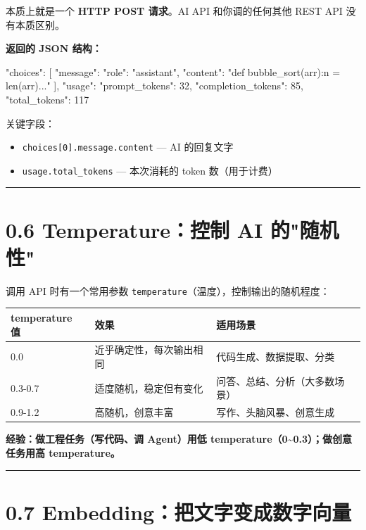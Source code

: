 本质上就是一个 \textbf{HTTP POST 请求}。AI API 和你调的任何其他 REST API 没有本质区别。


\textbf{返回的 JSON 结构：}


\begin{codeblock}
{
  "choices": [
    {
      "message": {
        "role": "assistant",
        "content": "def bubble_sort(arr):\n    n = len(arr)\n    ..."
      }
    }
  ],
  "usage": {
    "prompt_tokens": 32,
    "completion_tokens": 85,
    "total_tokens": 117
  }
}
\end{codeblock}

关键字段：

\begin{itemize}[leftmargin=2em]
\item \texttt{choices[0].message.content} --- AI 的回复文字
\item \texttt{usage.total\_tokens} --- 本次消耗的 token 数（用于计费）
\end{itemize}

\bigskip\hrule\bigskip

\section{0.6 Temperature：控制 AI 的"随机性"}

调用 API 时有一个常用参数 \texttt{temperature}（温度），控制输出的随机程度：


\begingroup
\scriptsize
\setlength{\tabcolsep}{3pt}
\begin{longtable}{|p{}|p{}|p{}|}
\hline
temperature 值 & 效果 & 适用场景 \\ \hline
0.0 & 近乎确定性，每次输出相同 & 代码生成、数据提取、分类 \\ \hline
0.3-0.7 & 适度随机，稳定但有变化 & 问答、总结、分析（大多数场景） \\ \hline
0.9-1.2 & 高随机，创意丰富 & 写作、头脑风暴、创意生成 \\ \hline
\end{longtable}
\endgroup

\textbf{经验：做工程任务（写代码、调 Agent）用低 temperature（0\textasciitilde{}0.3）；做创意任务用高 temperature。}


\bigskip\hrule\bigskip

\section{0.7 Embedding：把文字变成数字向量}

